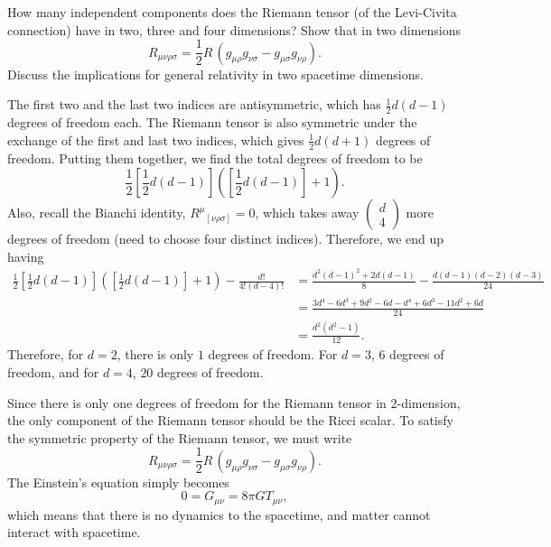 How many independent components does the Riemann tensor (of the Levi-Civita connection) have in two, three and four dimensions? Show that in two dimensions
\begin{equation}
    R_{\mu\nu\rho\sigma} = \frac{1}{2}R\,(g_{\mu\rho}g_{\nu\sigma} - g_{\mu\sigma}g_{\nu\rho}).
\end{equation}
Discuss the implications for general relativity in two spacetime dimensions.
\begin{solution}
    The first two and the last two indices are antisymmetric, which has $\tfrac{1}{2}d(d-1)$ degrees of freedom each. The Riemann tensor is also symmetric under the exchange of the first and last two indices, which gives $\tfrac{1}{2}d(d+1)$ degrees of freedom. Putting them together, we find the total degrees of freedom to be
    \begin{equation}
        \frac{1}{2}\left[\frac{1}{2}d(d-1)\right]\left(\left[\frac{1}{2}d(d-1)\right]  +1\right).
    \end{equation}
    Also, recall the Bianchi identity, $R^\mu{}_{[\nu\rho\sigma]} = 0$, which takes away $\begin{pmatrix}
        d\\4
    \end{pmatrix}$ more degrees of freedom (need to choose four distinct indices). Therefore, we end up having 
    \begin{equation}
    \begin{aligned}
        \frac{1}{2}\left[\frac{1}{2}d(d-1)\right]\left(\left[\frac{1}{2}d(d-1)\right]  +1\right) - \frac{d!}{4!(d-4)!} &= \frac{d^2(d-1)^2+2d(d-1)}{8} - \frac{d(d-1)(d-2)(d-3)}{24}\\
        &=\frac{3d^4-6d^3+9d^2-6d - d^4+6d^3-11d^2+6d}{24}\\
        &=\frac{d^2(d^2-1)}{12}.
    \end{aligned}
    \end{equation}
    Therefore, for $d=2$, there is only $1$ degrees of freedom. For $d=3$, $6$ degrees of freedom, and for $d=4$, $20$ degrees of freedom.

    Since there is only one degrees of freedom for the Riemann tensor in $2$-dimension, the only component of the Riemann tensor should be the Ricci scalar. To satisfy the symmetric property of the Riemann tensor, we must write
    \begin{equation}
        R_{\mu\nu\rho\sigma} = \frac{1}{2}R\,(g_{\mu\rho}g_{\nu\sigma} - g_{\mu\sigma}g_{\nu\rho}).
        \label{eq:R2d}
    \end{equation}
    The Einstein's equation simply becomes
    \begin{equation}
        0=G_{\mu\nu}= 8\pi G T_{\mu\nu},
    \end{equation}
    which means that there is no dynamics to the spacetime, and matter cannot interact with spacetime.
    
\end{solution}

